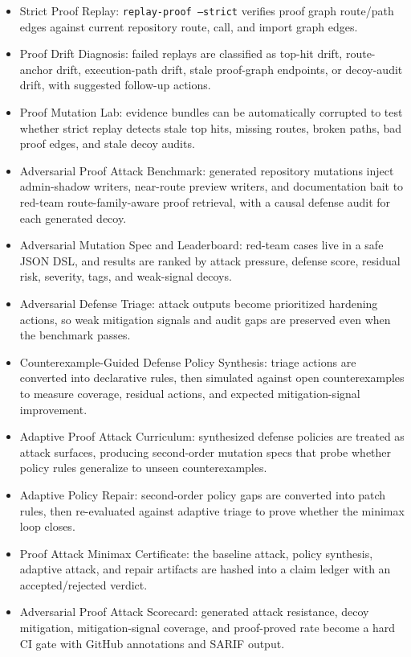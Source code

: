 \documentclass[UTF8,12pt,openany]{ctexbook}
\begin{document}
\begin{itemize}
\item Strict Proof Replay: \texttt{replay-proof --strict} verifies proof graph route/path edges against current repository route, call, and import graph edges.
\item Proof Drift Diagnosis: failed replays are classified as top-hit drift, route-anchor drift, execution-path drift, stale proof-graph endpoints, or decoy-audit drift, with suggested follow-up actions.
\item Proof Mutation Lab: evidence bundles can be automatically corrupted to test whether strict replay detects stale top hits, missing routes, broken paths, bad proof edges, and stale decoy audits.
\item Adversarial Proof Attack Benchmark: generated repository mutations inject admin-shadow writers, near-route preview writers, and documentation bait to red-team route-family-aware proof retrieval, with a causal defense audit for each generated decoy.
\item Adversarial Mutation Spec and Leaderboard: red-team cases live in a safe JSON DSL, and results are ranked by attack pressure, defense score, residual risk, severity, tags, and weak-signal decoys.
\item Adversarial Defense Triage: attack outputs become prioritized hardening actions, so weak mitigation signals and audit gaps are preserved even when the benchmark passes.
\item Counterexample-Guided Defense Policy Synthesis: triage actions are converted into declarative rules, then simulated against open counterexamples to measure coverage, residual actions, and expected mitigation-signal improvement.
\item Adaptive Proof Attack Curriculum: synthesized defense policies are treated as attack surfaces, producing second-order mutation specs that probe whether policy rules generalize to unseen counterexamples.
\item Adaptive Policy Repair: second-order policy gaps are converted into patch rules, then re-evaluated against adaptive triage to prove whether the minimax loop closes.
\item Proof Attack Minimax Certificate: the baseline attack, policy synthesis, adaptive attack, and repair artifacts are hashed into a claim ledger with an accepted/rejected verdict.
\item Adversarial Proof Attack Scorecard: generated attack resistance, decoy mitigation, mitigation-signal coverage, and proof-proved rate become a hard CI gate with GitHub annotations and SARIF output.

\end{itemize}
\end{document}
